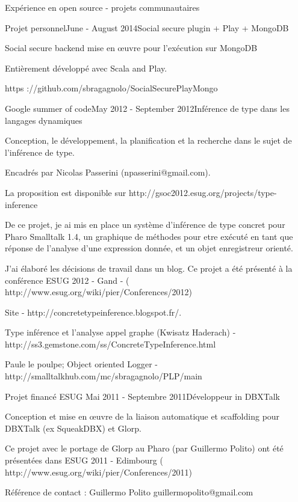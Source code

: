 \documentclass{resume} %
\begin{document}
\begin{rSection}{Exp\'{e}rience en open source - projets communautaires}
\begin{rSubsection}{Projet personnel}{June - August 2014}{Social secure plugin + Play + MongoDB}
	\item Social secure backend mise en \oe uvre pour l'ex\'{e}cution sur MongoDB
	\item Enti\`{e}rement d\'{e}velopp\'{e} avec Scala and Play.
	\item https ://github.com/sbragagnolo/SocialSecurePlayMongo
\end{rSubsection}


\begin{rSubsection}{Google summer of code}{May 2012 - September 2012}{Inf\'{e}rence de type dans les langages dynamiques}
	\item Conception, le d\'{e}veloppement, la planification et la recherche dans le sujet de l'inf\'{e}rence de type.
	\item Encadr\'{e}s par Nicolas Passerini (npasserini@gmail.com).
	\item La proposition est disponible sur  http://gsoc2012.esug.org/projects/type-inference
	\item De ce projet, je ai mis en place un syst\`{e}me d'inf\'{e}rence de type concret pour Pharo Smalltalk 1.4, un graphique de m\'{e}thodes pour etre ex\'{e}cut\'{e} en tant que r\'{e}ponse de l'analyse d'une expression donn\'{e}e, et un objet enregistreur orient\'{e}.
	\item J'ai \'{e}labor\'e les d\'{e}cisions de travail dans un blog. Ce projet a \'{e}t\'{e} pr\'{e}sent\'{e} \`a la conf\'{e}rence ESUG 2012 - Gand - ( http://www.esug.org/wiki/pier/Conferences/2012)
	\item Site -  http://concretetypeinference.blogspot.fr/. 
	\item Type inf\'{e}rence et l'analyse appel graphe (Kwisatz Haderach) -  http://ss3.gemstone.com/ss/ConcreteTypeInference.html
	\item Paule le poulpe; Object oriented Logger -  http://smalltalkhub.com/mc/sbragagnolo/PLP/main
\end{rSubsection}

 
\begin{rSubsection}{Projet financ\'{e} ESUG}{ Mai 2011 - Septembre 2011}{D\'{e}veloppeur in DBXTalk}
	\item Conception et mise en œuvre de la liaison automatique et scaffolding pour DBXTalk (ex SqueakDBX) et Glorp.
	\item Ce projet avec le portage de Glorp au Pharo (par Guillermo Polito) ont \'{e}t\'{e} pr\'{e}sent\'{e}es dans ESUG 2011 - Edimbourg ( http://www.esug.org/wiki/pier/Conferences/2011)
	\item  R\'{e}f\'{e}rence de contact :  Guillermo Polito guillermopolito@gmail.com
\end{rSubsection}


\end{rSection}
\end{document}
